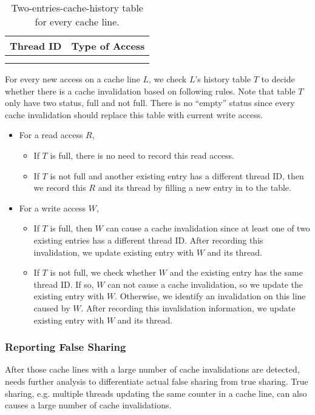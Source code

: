 \begin{table}
\centering
  \begin{tabular}{ l | r }
    \hline
    {Thread ID} & {Type of Access} \\ \hline
    \hline
     &   \\ \hline
     &   \\ \hline
  \end{tabular}
  \caption{Two-entries-cache-history table for every cache line. \label{table:cachehistory}}
\end{table} 


For every new access on a cache line $L$, we check $L$'s history table
$T$ to decide whether there is a cache invalidation based on following rules.
Note that table $T$ only have two status, full and not full. 
There is no ``empty'' status since every cache invalidation should 
replace this table with current write access.

\begin{itemize}
\item
  For a read access $R$, 
  \begin{itemize}
    \item
      If $T$ is full, there is no need to record this read access.
    \item
      If $T$ is not full and another existing entry has a different thread
      ID, then we record this $R$ and its thread by filling a new entry in to the table. 
  \end{itemize}
\item
  For a write access $W$, 
  \begin{itemize}
    \item
      If $T$ is full, then $W$ can cause a cache invalidation since at least 
      one of two existing entries has a different thread ID.
      After recording this invalidation, we update 
      existing entry with $W$ and its thread.
    \item
      If $T$ is not full,
      we check whether $W$ and the existing entry has the same thread ID. If
      so, $W$ can not cause a cache invalidation, so we update the existing
      entry with $W$. Otherwise, we identify an invalidation on this line caused by $W$. 
      After recording this invalidation information, we update 
      existing entry with $W$ and its thread.
  \end{itemize}
\end{itemize}

\subsubsection{Reporting False Sharing}
After those cache lines with a large number of cache invalidations are detected,
\Predator{} needs further analysis to differentiate actual false sharing from true sharing. 
True sharing, e.g. multiple threads updating 
the same counter in a cache line, can also causes a large number of cache invalidations.

